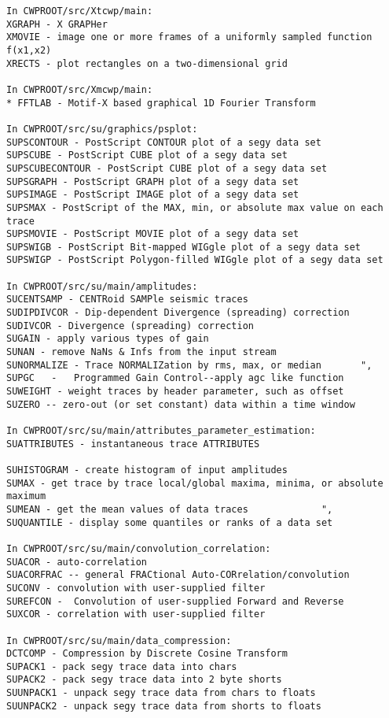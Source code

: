 {\begin{verbatim}
In CWPROOT/src/Xtcwp/main:
XGRAPH - X GRAPHer							
XMOVIE - image one or more frames of a uniformly sampled function f(x1,x2)
XRECTS - plot rectangles on a two-dimensional grid			

In CWPROOT/src/Xmcwp/main:
* FFTLAB - Motif-X based graphical 1D Fourier Transform

In CWPROOT/src/su/graphics/psplot:
SUPSCONTOUR - PostScript CONTOUR plot of a segy data set		
SUPSCUBE - PostScript CUBE plot of a segy data set			
SUPSCUBECONTOUR - PostScript CUBE plot of a segy data set		
SUPSGRAPH - PostScript GRAPH plot of a segy data set			
SUPSIMAGE - PostScript IMAGE plot of a segy data set			
SUPSMAX - PostScript of the MAX, min, or absolute max value on each trace
SUPSMOVIE - PostScript MOVIE plot of a segy data set			
SUPSWIGB - PostScript Bit-mapped WIGgle plot of a segy data set	
SUPSWIGP - PostScript Polygon-filled WIGgle plot of a segy data set	

In CWPROOT/src/su/main/amplitudes:
SUCENTSAMP - CENTRoid SAMPle seismic traces			
SUDIPDIVCOR - Dip-dependent Divergence (spreading) correction	
SUDIVCOR - Divergence (spreading) correction				
SUGAIN - apply various types of gain				  	
SUNAN - remove NaNs & Infs from the input stream		
SUNORMALIZE - Trace NORMALIZation by rms, max, or median       ", 
SUPGC   -   Programmed Gain Control--apply agc like function	
SUWEIGHT - weight traces by header parameter, such as offset		
SUZERO -- zero-out (or set constant) data within a time window	

In CWPROOT/src/su/main/attributes_parameter_estimation:
SUATTRIBUTES - instantaneous trace ATTRIBUTES 			

SUHISTOGRAM - create histogram of input amplitudes		
SUMAX - get trace by trace local/global maxima, minima, or absolute maximum
SUMEAN - get the mean values of data traces				",	
SUQUANTILE - display some quantiles or ranks of a data set            

In CWPROOT/src/su/main/convolution_correlation:
SUACOR - auto-correlation						
SUACORFRAC -- general FRACtional Auto-CORrelation/convolution		
SUCONV - convolution with user-supplied filter			
SUREFCON -  Convolution of user-supplied Forward and Reverse		
SUXCOR - correlation with user-supplied filter			

In CWPROOT/src/su/main/data_compression:
DCTCOMP - Compression by Discrete Cosine Transform			
SUPACK1 - pack segy trace data into chars			
SUPACK2 - pack segy trace data into 2 byte shorts		
SUUNPACK1 - unpack segy trace data from chars to floats	
SUUNPACK2 - unpack segy trace data from shorts to floats	


\end{verbatim}}
